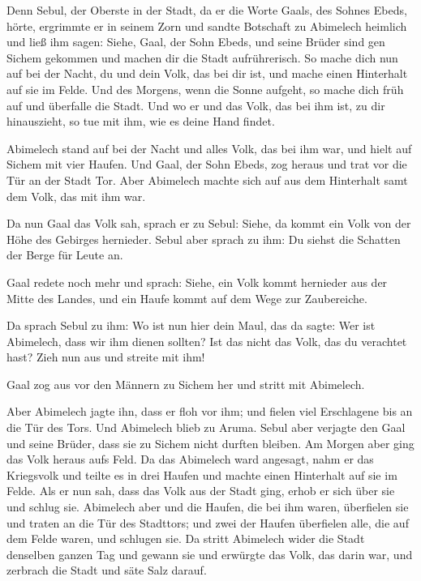  Denn Sebul, der Oberste in der Stadt, da er die Worte
Gaals, des Sohnes Ebeds, hörte, ergrimmte er in seinem Zorn
 und sandte Botschaft zu Abimelech heimlich und ließ ihm
sagen: Siehe, Gaal, der Sohn Ebeds, und seine Brüder sind gen Sichem
gekommen und machen dir die Stadt aufrührerisch.  So
mache dich nun auf bei der Nacht, du und dein Volk, das bei dir ist, und
mache einen Hinterhalt auf sie im Felde.  Und des
Morgens, wenn die Sonne aufgeht, so mache dich früh auf und überfalle
die Stadt. Und wo er und das Volk, das bei ihm ist, zu dir hinauszieht,
so tue mit ihm, wie es deine Hand findet.

 Abimelech stand auf bei der Nacht und alles Volk, das
bei ihm war, und hielt auf Sichem mit vier Haufen.  Und
Gaal, der Sohn Ebeds, zog heraus und trat vor die Tür an der Stadt Tor.
Aber Abimelech machte sich auf aus dem Hinterhalt samt dem Volk, das mit
ihm war.

 Da nun Gaal das Volk sah, sprach er zu Sebul: Siehe, da
kommt ein Volk von der Höhe des Gebirges hernieder. Sebul aber sprach zu
ihm: Du siehst die Schatten der Berge für Leute an.

 Gaal redete noch mehr und sprach: Siehe, ein Volk kommt
hernieder aus der Mitte des Landes, und ein Haufe kommt auf dem Wege zur
Zaubereiche.

 Da sprach Sebul zu ihm: Wo ist nun hier dein Maul, das
da sagte: Wer ist Abimelech, dass wir ihm dienen sollten? Ist das nicht
das Volk, das du verachtet hast? Zieh nun aus und streite mit ihm!

 Gaal zog aus vor den Männern zu Sichem her und stritt
mit Abimelech.

 Aber Abimelech jagte ihn, dass er floh vor ihm; und
fielen viel Erschlagene bis an die Tür des Tors.  Und
Abimelech blieb zu Aruma. Sebul aber verjagte den Gaal und seine Brüder,
dass sie zu Sichem nicht durften bleiben.  Am Morgen aber
ging das Volk heraus aufs Feld. Da das Abimelech ward angesagt,
 nahm er das Kriegsvolk und teilte es in drei Haufen und
machte einen Hinterhalt auf sie im Felde. Als er nun sah, dass das Volk
aus der Stadt ging, erhob er sich über sie und schlug sie.
 Abimelech aber und die Haufen, die bei ihm waren,
überfielen sie und traten an die Tür des Stadttors; und zwei der Haufen
überfielen alle, die auf dem Felde waren, und schlugen sie.
 Da stritt Abimelech wider die Stadt denselben ganzen Tag
und gewann sie und erwürgte das Volk, das darin war, und zerbrach die
Stadt und säte Salz darauf.

